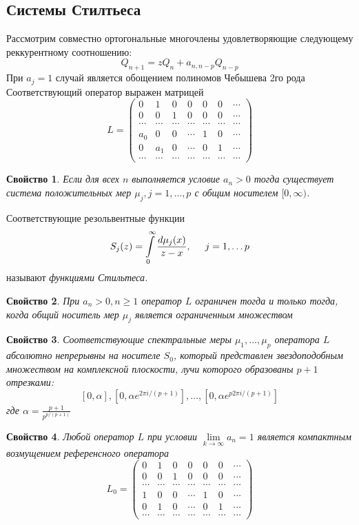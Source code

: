 \documentclass[12pt, a4paper]{report}
\newtheorem{prope}{Свойство} [chapter]
\begin{document}
\subsection{Системы Стилтьеса}
Рассмотрим совместно ортогональные многочлены удовлетворяющие следующему реккурентному соотношению:
$$
Q_{n+1}=zQ_n+ a_{n,n-p}Q_{n-p}
$$
При $a_j=1$ случай является обощением полиномов Чебышева 2го рода \\
Соответствующий оператор выражен матрицей
\begin{equation}
L = \left(\begin{array}{ccccccc}
0 & 1&0&0&0&0&\cdots\\
0 & 0 &1&0&0&0&\cdots\\
\cdots&\cdots&\cdots&\cdots&\cdots&\cdots&\cdots\\
a_0&0&0&\cdots&1&0&\cdots\\
0&a_1&0&\cdots&0&1&\cdots\\
\cdots&\cdots&\cdots&\cdots&\cdots&\cdots&\cdots
\end{array}\right)
\end{equation}

\begin{prope}
Если для всех $n$ выполняется условие $a_n > 0$ тогда существует система положительных мер $\mu_j, j=1,\ldots,p$ с общим носителем $[0, \infty)$. 
\end{prope}
Соответствующие резольвентные функции 
$$
S_j(z) = \int \limits_{0}^{\infty} {\displaystyle\frac{d\mu_j(x)}{z-x}}, \hspace{0.5cm} j=1, \ldots p
$$
называют \it функциями Стильтеса\rm.
\begin{prope}
При $a_n > 0, n \geq 1$ оператор $L$ ограничен тогда и только тогда, когда общий носитель мер $\mu_j$ является ограниченным множеством
\end{prope}
\begin{prope}
Соответствующие спектральные меры $\mu_1, \ldots, \mu_p$ оператора $L$ абсолютно непрерывны на носителе $S_0$, который представлен звездоподобным множеством на комплексной плоскости, лучи которого образованы $p+1$ отрезками:
$$
[0,\alpha], [0, \alpha e^{2\pi i / (p+1)}], \ldots , [0, \alpha e^{p 2\pi i /(p+1)}]
$$ 
где $\alpha=\displaystyle \frac{p+1}{p^{p/(p+1)}}$
\end{prope}
\begin{prope}
Любой оператор $L$ при условии $\lim \limits_{k \rightarrow \infty} a_n = 1$ является компактным возмущением референсного оператора
 \begin{equation}
L_0 = \left(\begin{array}{ccccccc}
0 & 1&0&0&0&0&\cdots\\
0 & 0 &1&0&0&0&\cdots\\
\cdots&\cdots&\cdots&\cdots&\cdots&\cdots&\cdots\\
1&0&0&\cdots&1&0&\cdots\\
0&1&0&\cdots&0&1&\cdots\\
\cdots&\cdots&\cdots&\cdots&\cdots&\cdots&\cdots
\end{array}\right)
\end{equation}
\end{prope}
\end{document}

